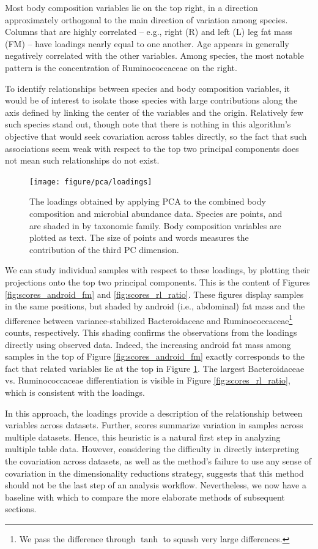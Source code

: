 \documentclass{article}
\begin{document}
Most body composition variables lie on the top right, in a direction
approximately orthogonal to the main direction of variation among species.
Columns that are highly correlated -- e.g., right (R) and left (L) leg fat mass
(FM) -- have loadings nearly equal to one another. Age appears in generally
negatively correlated with the other variables. Among species, the most notable
pattern is the concentration of Ruminococcaceae on the right.

To identify relationships between species and body composition variables, it
would be of interest to isolate those species with large contributions along the
axis defined by linking the center of the variables and the origin. Relatively
few such species stand out, though note that there is nothing in this
algorithm's objective that would seek covariation across tables directly, so the
fact that such associations seem weak with respect to the top two principal
components does not mean such relationships do not exist.

\begin{figure}
  \centering
  \texttt{[image: figure/pca/loadings]}
  \caption{The loadings obtained by applying PCA to the combined body
    composition and microbial abundance data. Species are points, and are
    shaded in by taxonomic family. Body composition variables are plotted as
    text. The size of points and words measures the contribution of the third PC
    dimension. \label{fig:loadings} }
\end{figure}

We can study individual samples with respect to these loadings, by plotting
their projections onto the top two principal components. This is the content of
Figures \ref{fig:scores_android_fm} and \ref{fig:scores_rl_ratio}. These figures
display samples in the same positions, but shaded by android (i.e., abdominal)
fat mass and the difference between variance-stabilized Bacteroidaceae and
Ruminococcaceae\footnote{We pass the difference through $\tanh$ to squash very
  large differences.} counts, respectively. This shading confirms the
observations from the loadings directly using observed data. Indeed, the
increasing android fat mass among samples in the top of Figure
\ref{fig:scores_android_fm} exactly corresponds to the fact that related
variables lie at the top in Figure \ref{fig:loadings}. The largest
Bacteroidaceae vs. Ruminococcaceae differentiation is visible in Figure
\ref{fig:scores_rl_ratio}, which is consistent with the loadings.

In this approach, the loadings provide a description of the relationship between
variables across datasets. Further, scores summarize variation in samples
across multiple datasets. Hence, this heuristic is a natural first step in
analyzing multiple table data. However, considering the difficulty in directly
interpreting the covariation across datasets, as well as the method's failure
to use any sense of covariation in the dimensionality reductions strategy,
suggests that this method should not be the last step of an analysis workflow.
Nevertheless, we now have a baseline with which to compare the more elaborate
methods of subsequent sections.
\end{document}

